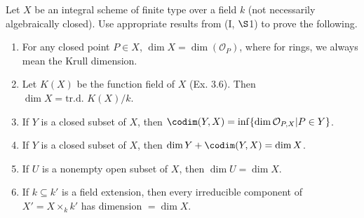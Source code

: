 \begin{exercise}[Dimension]
	Let $X$ be an integral scheme of finite type over a field $k$ (not necessarily algebraically closed). Use appropriate results from (I, $\S $1) to prove the following.
	\begin{enumerate}
		\item For any closed point $P \in X$, $\dim X = \dim(\mathcal{O}_P)$, where for rings, we always mean the Krull dimension.
		\item Let $K(X)$ be the function field of $X$ (Ex. 3.6). Then $\dim X = \text{tr.d. }K(X)/k$.
		\item If $Y$ is a closed subset of $X$, then $\codim(Y,X) = \inf\{\dim \mathcal{O}_{P,X}|P \in Y\}$.
		\item If $Y$ is a closed subset of $X$, then $\dim Y + \codim(Y,X) = \dim X$.
		\item If $U$ is a nonempty open subset of $X$, then $\dim U = \dim X$.
		\item If $k \subseteq k'$ is a field extension, then every irreducible component of $X' = X \times _k k'$ has dimension $= \dim X$.
	\end{enumerate}
\end{exercise}
